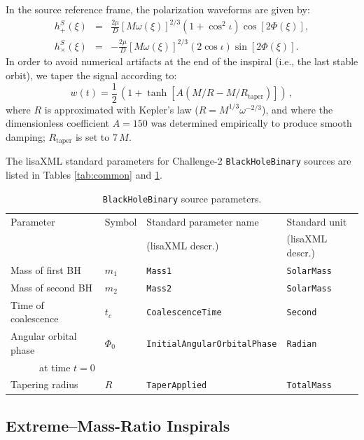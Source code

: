 \documentclass[12pt]{iopart}
\begin{document}
In the source reference frame, the polarization waveforms are given by:
%
\begin{eqnarray}
h^S_{+}(\xi) &=& \frac{2\mu}{D}[M\omega(\xi)]^{2/3}(1+\cos^2 \iota)\cos [2\Phi(\xi)], \\
h^S_{\times}(\xi) &=& -\frac{2\mu}{D}[M\omega(\xi)]^{2/3}(2 \cos \iota) \sin [2\Phi(\xi)]. 
\end{eqnarray}
%
In order to avoid numerical artifacts at the end of the inspiral (i.e., the last stable orbit), we taper the signal according to:
%
\begin{equation}
w(t) = \frac{1}{2}\,\left( 1 + \tanh\left[A (M/R - M/R_\mathrm{taper})\right] \right)\,,
\end{equation}
%
where $R$ is approximated with Kepler's law ($R = M^{1/3} \omega^{-2/3}$), and
where the dimensionless coefficient $A = 150$ was determined empirically to produce smooth damping; $R_\mathrm{taper}$ is set to $7\, M$.

The lisaXML standard parameters for Challenge-2 \texttt{BlackHoleBinary} sources are listed in Tables \ref{tab:common} and \ref{tab:bbh}.
%
\begin{table}
\begin{tabular}{llll}
\hline
{Parameter} &
{Symbol} &
{Standard parameter name} &
{Standard unit} \\
& & (lisaXML descr.) & (lisaXML descr.) \\
\hline
Mass of first BH    & $m_1$  & \texttt{Mass1}           & \texttt{SolarMass} \\
Mass of second BH   & $m_2$  & \texttt{Mass2}           & \texttt{SolarMass} \\
Time of coalescence & $t_c$  & \texttt{CoalescenceTime} & \texttt{Second} \\
Angular orbital phase & $\Phi_0$ & \texttt{InitialAngularOrbitalPhase} & \texttt{Radian} \\
\multicolumn{1}{r}{at time $t = 0$} & & & \\
Tapering radius & $R$    & \texttt{TaperApplied}    & \texttt{TotalMass} \\ 
\hline
\end{tabular}
\caption{\texttt{BlackHoleBinary} source parameters.\label{tab:bbh}}
\end{table}

\subsection{Extreme--Mass-Ratio Inspirals}
\end{document}
